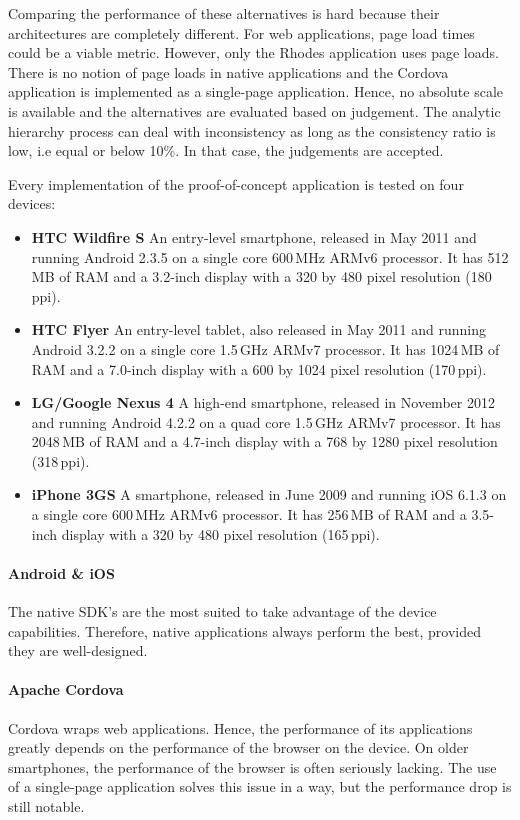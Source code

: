Comparing the performance of these alternatives is hard because their architectures are completely different. For web applications, page load times could be a viable metric. However, only the Rhodes application uses page loads. There is no notion of page loads in native applications and the Cordova application is implemented as a single-page application. Hence, no absolute scale is available and the alternatives are evaluated based on judgement. The analytic hierarchy process can deal with inconsistency as long as the consistency ratio is low, i.e equal or below 10\%. In that case, the judgements are accepted.

Every implementation of the proof-of-concept application is tested on four devices:
\begin{itemize}
    \item \textbf{HTC Wildfire S} An entry-level smartphone, released in May 2011 and running Android 2.3.5 on a single core 600\,MHz ARMv6 processor. It has 512\,MB of RAM and a 3.2-inch display with a 320 by 480 pixel resolution (180\,ppi).
    \item \textbf{HTC Flyer} An entry-level tablet, also released in May 2011 and running Android 3.2.2 on a single core 1.5\,GHz ARMv7 processor. It has 1024\,MB of RAM and a 7.0-inch display with a 600 by 1024 pixel resolution (170\,ppi).
    \item \textbf{LG/Google Nexus 4} A high-end smartphone, released in November 2012 and running Android 4.2.2 on a quad core 1.5\,GHz ARMv7 processor. It has 2048\,MB of RAM and a 4.7-inch display with a 768 by 1280 pixel resolution (318\,ppi).
    \item \textbf{iPhone 3GS} A smartphone, released in June 2009 and running iOS 6.1.3 on a single core 600\,MHz ARMv6 processor. It has 256\,MB of RAM and a 3.5-inch display with a 320 by 480 pixel resolution (165\,ppi).
\end{itemize}

\paragraph{Android \& iOS} The native SDK's are the most suited to take advantage of the device capabilities. Therefore, native applications always perform the best, provided they are well-designed.

\paragraph{Apache Cordova} Cordova wraps web applications. Hence, the performance of its applications greatly depends on the performance of the browser on the device. On older smartphones, the performance of the browser is often seriously lacking. The use of a single-page application solves this issue in a way, but the performance drop is still notable.

